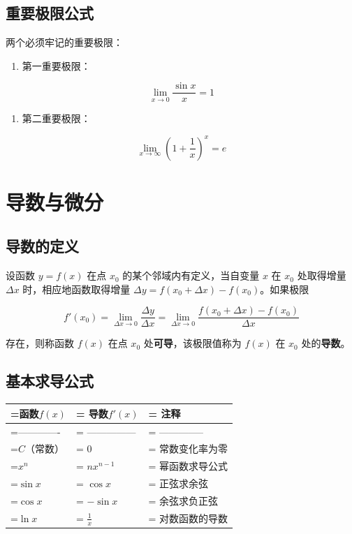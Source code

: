 \documentclass{harryopo-mathnotes}
\begin{document}
\subsection{重要极限公式}

两个必须牢记的重要极限：

\begin{enumerate}
  \item 第一重要极限：
\end{enumerate}

$$
\lim_{x \to 0} \frac{\sin x}{x} = 1
$$

\begin{enumerate}
  \item 第二重要极限：
\end{enumerate}

$$
\lim_{x \to \infty} \left(1 + \frac{1}{x}\right)^x = e
$$

\section{导数与微分}

\subsection{导数的定义}

设函数 $y = f(x)$ 在点 $x_0$ 的某个邻域内有定义，当自变量 $x$ 在 $x_0$ 处取得增量 $\Delta x$ 时，相应地函数取得增量 $\Delta y = f(x_0 + \Delta x) - f(x_0)$。如果极限

$$
f'(x_0) = \lim_{\Delta x \to 0} \frac{\Delta y}{\Delta x} = \lim_{\Delta x \to 0} \frac{f(x_0 + \Delta x) - f(x_0)}{\Delta x}
$$

存在，则称函数 $f(x)$ 在点 $x_0$ 处\textbf{可导}，该极限值称为 $f(x)$ 在 $x_0$ 处的\textbf{导数}。

\subsection{基本求导公式}

\begin{table}[htbp]
\centering
\begin{tabularx}{\textwidth}{>{\hsize=0.929\hsize\linewidth=\hsize}X>{\hsize=1.071\hsize\linewidth=\hsize}X>{\hsize=1.000\hsize\linewidth=\hsize}X}
\toprule
\textbf{函数$f(x)$} & \textbf{导数$f'(x)$} & \textbf{注释} \\
\midrule
------------- & --------------- & -------------- \\
$C$（常数） & $0$ & 常数变化率为零 \\
$x^n$ & $nx^{n-1}$ & 幂函数求导公式 \\
$\sin x$ & $\cos x$ & 正弦求余弦 \\
$\cos x$ & $-\sin x$ & 余弦求负正弦 \\
$\ln x$ & $\frac{1}{x}$ & 对数函数的导数 \\
\bottomrule
\end{tabularx}
\end{table}
\end{document}
